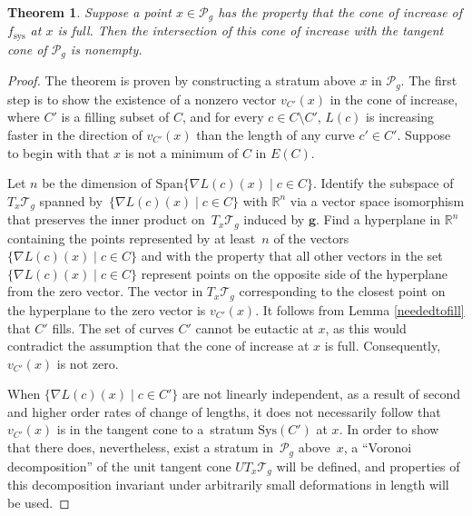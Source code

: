 \documentclass[11pt]{article}
\numberwithin{equation}{section}
\numberwithin{equation}{section}
\newtheorem{Theorem}{Theorem}[section]
\begin{document}
\begin{Theorem}
\label{balancedthm2}
Suppose a point $x\in \mathcal{P}_{g}$ has the property that the cone of increase of $f_{\mathrm{sys}}$ at $x$ is full. Then the intersection of this cone of increase with the tangent cone of $\mathcal{P}_{g}$ is nonempty.
\end{Theorem}
\begin{proof}
The theorem is proven by constructing a stratum above $x$ in $\mathcal{P}_{g}$. The first step is to show the existence of a nonzero vector $v_{C'}(x)$ in the cone of increase, where $C'$ is a filling subset of $C$, and for every $c\in C\setminus C'$, $L(c)$ is increasing faster in the direction of $v_{C'}(x)$ than the length of any curve $c'\in C'$. Suppose to begin with that $x$ is not a minimum of $C$ in $E(C)$.

Let $n$ be the dimension of $\mathrm{Span}\{\nabla L(c)(x) \mid c\in C\}$. Identify the subspace of $T_{x}\mathcal{T}_{g}$ spanned by~$\{\nabla L(c)(x) \mid c\in C\}$ with $\mathbb{R}^{n}$ via a vector space isomorphism that preserves the inner product on~$T_{x}\mathcal{T}_{g}$ induced by $\mathbf{g}$. Find a hyperplane in $\mathbb{R}^{n}$ containing the points represented by at least~$n$ of the vectors $\{\nabla L(c)(x) \mid c\in C\}$ and with the property that all other vectors in the set~$\{\nabla L(c)(x) \mid c\in C\}$ represent points on the opposite side of the hyperplane from the zero vector. The vector in $T_{x}\mathcal{T}_{g}$ corresponding to the closest point on the hyperplane to the zero vector is $v_{C'}(x)$. It follows from Lemma \ref{neededtofill} that $C'$ fills. The set of curves $C'$ cannot be eutactic at $x$, as this would contradict the assumption that the cone of increase at $x$ is full. Consequently, $v_{C'}(x)$ is not zero.

When $\{\nabla L(c)(x) \mid c\in C'\}$ are not linearly independent, as a result of second and higher order rates of change of lengths, it does not necessarily follow that $v_{C'}(x)$ is in the tangent cone to a~stratum $\mathrm{Sys}(C')$ at $x$. In order to show that there does, nevertheless, exist a stratum in~$\mathcal{P}_{g}$ above~$x$, a ``Voronoi decomposition'' of the unit tangent cone $UT_{x}\mathcal{T}_{g}$ will be defined, and properties of this decomposition invariant under arbitrarily small deformations in length will be used.


\end{proof}
\end{document}
